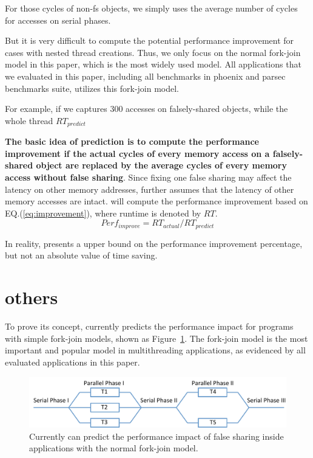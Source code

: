 For those cycles of non-fs objects, we simply uses the average number of cycles for accesses on serial phases. 


But it is very difficult to compute the potential performance improvement for cases with nested thread creations. Thus, we only focus on the normal fork-join model in this paper, which is the most widely used model. All applications that we evaluated in this paper, including all benchmarks in phoenix and parsec benchmarks suite, utilizes this fork-join model. 


For example, if we captures 300 accesses on falsely-shared objects, while the whole thread 
$RT_{predict}$ 

{\bf The basic idea of prediction is to compute the performance improvement if the actual cycles of every memory access on a
falsely-shared object are replaced by the average cycles of every memory access without false sharing}. Since fixing one false sharing may affect the latency on other memory addresses, \cheetah{} further assumes that the latency of other memory accesses are intact. \cheetah{} will compute the performance improvement based on EQ.(\ref{eq:improvement}), where runtime is denoted by $RT$.
\begin{equation}
\label{eq:improvement}
Perf_{improve}=RT_{actual}/RT_{predict}
\end{equation}


In reality, \Cheetah{} presents a upper bound on the performance improvement percentage, but not an absolute value of time saving.


\section{others}

To prove its concept, \cheetah{} currently predicts the performance impact for programs with simple fork-join models, shown as Figure~\ref{fig:forkjoinmodel}. 
The fork-join model is the most important and popular model in multithreading applications, as evidenced by all evaluated applications in this paper. 

\begin{figure}[ht!]
\begin{center}
\includegraphics[width=6.5in]{figure/forkjoin}
\end{center}
\caption{Currently \Cheetah{} can predict the performance impact of false sharing inside applications with the normal fork-join model.
\label{fig:forkjoinmodel}}
\end{figure}



